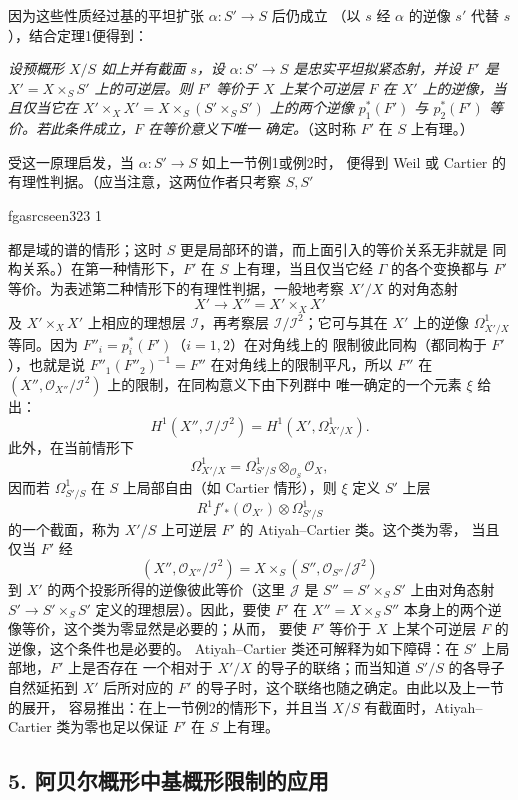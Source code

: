 \documentclass[12pt,twoside,openany]{book}
\numberwithin{equation}{section}
\newcommand{\fgaunitid}{unbound}
\newcommand{\src}[1]{%
  \phantomsection
  \hypertarget{src:\fgaunitid:#1}{}%
  \hypertarget{fga.\fgaunitid.p#1}{}%
  \ifcsname fgasrcseen#1\endcsname\else
    \expandafter\gdef\csname fgasrcseen#1\endcsname{1}%
    \hypertarget{src:#1}{}%
  \fi
  \marginpar{\raggedleft\footnotesize\sffamily #1}%
}
\theoremstyle{plain}
\theoremstyle{definition}
\theoremstyle{remark}
\begin{document}
因为这些性质经过基的平坦扩张 $\alpha:S'\longrightarrow S$ 后仍成立
（以 $s$ 经 $\alpha$ 的逆像 $s'$ 代替 $s$），结合定理1便得到：

\emph{设预概形 $X/S$ 如上并有截面 $s$，设
$\alpha:S'\longrightarrow S$ 是忠实平坦拟紧态射，并设 $F'$ 是
$X'=X\times_SS'$ 上的可逆层。则 $F'$ 等价于 $X$ 上某个可逆层 $F$ 在
$X'$ 上的逆像，当且仅当它在
$X'\times_XX'=X\times_S(S'\times_SS')$ 上的两个逆像
$p_1^*(F')$ 与 $p_2^*(F')$ 等价。若此条件成立，$F$ 在等价意义下唯一
确定。}（这时称 $F'$ 在 $S$ 上有理。）

受这一原理启发，当 $\alpha:S'\longrightarrow S$ 如上一节例1或例2时，
便得到 Weil 或 Cartier 的有理性判据。（应当注意，这两位作者只考察
$S,S'$

\src{323}
都是域的谱的情形；这时 $S$ 更是局部环的谱，而上面引入的等价关系无非就是
同构关系。）在第一种情形下，$F'$ 在 $S$ 上有理，当且仅当它经 $\Gamma$
的各个变换都与 $F'$ 等价。为表述第二种情形下的有理性判据，一般地考察
$X'/X$ 的对角态射
\[
  X'\longrightarrow X''=X'\times_XX'
\]
及 $X'\times_XX'$ 上相应的理想层 $\mathcal I$，再考察层
$\mathcal I/\mathcal I^2$；它可与其在 $X'$ 上的逆像
$\Omega^1_{X'/X}$ 等同。因为 $F''_i=p_i^*(F')$（$i=1,2$）在对角线上的
限制彼此同构（都同构于 $F'$），也就是说
$F''_1(F''_2)^{-1}=F''$ 在对角线上的限制平凡，所以 $F''$ 在
$(X'',\mathcal O_{X''}/\mathcal I^2)$ 上的限制，在同构意义下由下列群中
唯一确定的一个元素 $\xi$ 给出：
\[
  H^1(X'',\mathcal I/\mathcal I^2)
  =H^1(X',\Omega^1_{X'/X}).
\]
此外，在当前情形下
\[
  \Omega^1_{X'/X}
  =\Omega^1_{S'/S}\otimes_{\mathcal O_S}\mathcal O_X,
\]
因而若 $\Omega^1_{S'/S}$ 在 $S$ 上局部自由（如 Cartier 情形），则 $\xi$
定义 $S'$ 上层
\[
  R^1f'_*(\mathcal O_{X'})\otimes\Omega^1_{S'/S}
\]
的一个截面，称为 $X'/S$ 上可逆层 $F'$ 的 Atiyah--Cartier 类。这个类为零，
当且仅当 $F'$ 经
\[
  (X'',\mathcal O_{X''}/\mathcal I^2)
  =X\times_S(S'',\mathcal O_{S''}/\mathcal J^2)
\]
到 $X'$ 的两个投影所得的逆像彼此等价（这里 $\mathcal J$ 是
$S''=S'\times_SS'$ 上由对角态射
$S'\longrightarrow S'\times_SS'$ 定义的理想层）。因此，要使 $F'$ 在
$X''=X\times_SS''$ 本身上的两个逆像等价，这个类为零显然是必要的；从而，
要使 $F'$ 等价于 $X$ 上某个可逆层 $F$ 的逆像，这个条件也是必要的。
Atiyah--Cartier 类还可解释为如下障碍：在 $S'$ 上局部地，$F'$ 上是否存在
一个相对于 $X'/X$ 的导子的联络；而当知道 $S'/S$ 的各导子自然延拓到
$X'$ 后所对应的 $F'$ 的导子时，这个联络也随之确定。由此以及上一节的展开，
容易推出：在上一节例2的情形下，并且当 $X/S$ 有截面时，Atiyah--Cartier
类为零也足以保证 $F'$ 在 $S$ 上有理。

\subsection*{5. 阿贝尔概形中基概形限制的应用}
\end{document}

